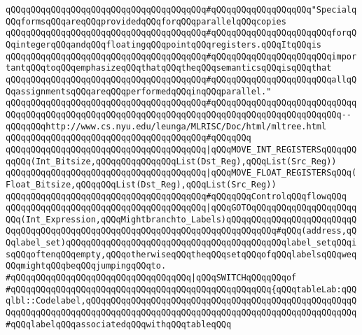 \newline
\verb|qQQqqQQqqQQqqQQqqQQqqQQqqQQqqQQqqQQqqQQq#qQQqqQQqqQQqqQQqqQQq"SpecialqQQqformsqQQqareqQQqprovidedqQQqforqQQqparallelqQQqcopies|\newline
\verb|qQQqqQQqqQQqqQQqqQQqqQQqqQQqqQQqqQQqqQQq#qQQqqQQqqQQqqQQqqQQqqQQqforqQQqintegerqQQqandqQQqfloatingqQQqpointqQQqregisters.qQQqItqQQqis|\newline
\verb|qQQqqQQqqQQqqQQqqQQqqQQqqQQqqQQqqQQqqQQq#qQQqqQQqqQQqqQQqqQQqqQQqimportantqQQqtoqQQqemphasizeqQQqthatqQQqtheqQQqsemanticsqQQqisqQQqthat|\newline
\verb|qQQqqQQqqQQqqQQqqQQqqQQqqQQqqQQqqQQqqQQq#qQQqqQQqqQQqqQQqqQQqqQQqallqQQqassignmentsqQQqareqQQqperformedqQQqinqQQqparallel."|\newline
\verb|qQQqqQQqqQQqqQQqqQQqqQQqqQQqqQQqqQQqqQQq#qQQqqQQqqQQqqQQqqQQqqQQqqQQqqQQqqQQqqQQqqQQqqQQqqQQqqQQqqQQqqQQqqQQqqQQqqQQqqQQqqQQqqQQqqQQqqQQq--qQQqqQQqhttp://www.cs.nyu.edu/leunga/MLRISC/Doc/html/mltree.html|\newline
\verb|qQQqqQQqqQQqqQQqqQQqqQQqqQQqqQQqqQQqqQQq#qQQqqQQq|\newline
\verb|qQQqqQQqqQQqqQQqqQQqqQQqqQQqqQQqqQQqqQQq|\verb#|qQQqMOVE_INT_REGISTERSqQQqqQQqqQQq(Int_Bitsize,qQQqqQQqqQQqqQQqList(Dst_Reg),qQQqList(Src_Reg))#\newline
\verb|qQQqqQQqqQQqqQQqqQQqqQQqqQQqqQQqqQQqqQQq|\verb#|qQQqMOVE_FLOAT_REGISTERSqQQq(Float_Bitsize,qQQqqQQqList(Dst_Reg),qQQqList(Src_Reg))#\newline
\newline
\verb|qQQqqQQqqQQqqQQqqQQqqQQqqQQqqQQqqQQqqQQq#qQQqqQQqControlqQQqflowqQQq|\newline
\verb|qQQqqQQqqQQqqQQqqQQqqQQqqQQqqQQqqQQqqQQq|\verb#|qQQqGOTOqQQqqQQqqQQqqQQqqQQqqQQq(Int_Expression,qQQqMightbranchto_Labels)qQQqqQQqqQQqqQQqqQQqqQQqqQQqqQQqqQQqqQQqqQQqqQQqqQQqqQQqqQQqqQQqqQQqqQQqqQQqqQQq#\verb|#qQQq(address,qQQqlabel_set)qQQqqQQqqQQqqQQqqQQqqQQqqQQqqQQqqQQqqQQqqQQqlabel_setqQQqisqQQqoftenqQQqempty,qQQqotherwiseqQQqtheqQQqsetqQQqofqQQqlabelsqQQqweqQQqmightqQQqbeqQQqjumpingqQQqto.|\newline
\newline
\verb|#qQQqqQQqqQQqqQQqqQQqqQQqqQQqqQQqqQQq|\verb#|qQQqSWITCHqQQqqQQqof#\newline
\verb|#qQQqqQQqqQQqqQQqqQQqqQQqqQQqqQQqqQQqqQQqqQQqqQQqqQQq{qQQqtableLab:qQQqlbl::Codelabel,qQQqqQQqqQQqqQQqqQQqqQQqqQQqqQQqqQQqqQQqqQQqqQQqqQQqqQQqqQQqqQQqqQQqqQQqqQQqqQQqqQQqqQQqqQQqqQQqqQQqqQQqqQQqqQQqqQQqqQQqqQQq#qQQqlabelqQQqassociatedqQQqwithqQQqtableqQQq|\newline
